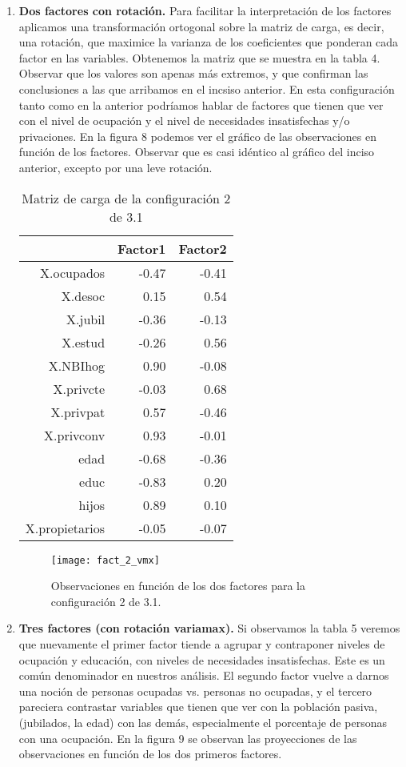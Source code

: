 \documentclass[a4paper,10pt]{article}
\begin{document}
\begin{enumerate}
 \item \textbf{Dos factores con rotación.} Para facilitar la interpretación de los factores aplicamos una transformación ortogonal sobre la matriz de 
 carga, es decir, una rotación, que maximice la varianza de los coeficientes que ponderan cada factor en las variables. Obtenemos la matriz que se 
 muestra en la tabla 4. Observar que los valores son apenas más extremos, y que confirman las conclusiones a las que arribamos en el incsiso anterior.
 En esta configuración tanto como en la anterior podríamos hablar de factores que tienen que ver con el nivel de ocupación y el nivel de necesidades
 insatisfechas y/o privaciones.
 En la figura 8 podemos ver el gráfico de las observaciones en función de los factores. Observar que es casi idéntico al gráfico del inciso anterior, 
 excepto por una leve rotación.
 
  \begin{table}[ht]
  \centering
  \begin{tabular}{rrr}
    \hline
  & Factor1 & Factor2 \\ 
    \hline
  X.ocupados & -0.47 & -0.41 \\ 
    X.desoc & 0.15 & 0.54 \\ 
    X.jubil & -0.36 & -0.13 \\ 
    X.estud & -0.26 & 0.56 \\ 
    X.NBIhog & 0.90 & -0.08 \\ 
    X.privcte & -0.03 & 0.68 \\ 
    X.privpat & 0.57 & -0.46 \\ 
    X.privconv & 0.93 & -0.01 \\ 
    edad & -0.68 & -0.36 \\ 
    educ & -0.83 & 0.20 \\ 
    hijos & 0.89 & 0.10 \\ 
    X.propietarios & -0.05 & -0.07 \\ 
    \hline
  \end{tabular}
  \caption{Matriz de carga de la configuración 2 de 3.1}
  \end{table}
  
  \begin{figure}[h]
  \centering
  \texttt{[image: fact\_2\_vmx]}
  \caption{Observaciones en función de los dos factores para la configuración 2 de 3.1.}
  \end{figure}
 
 \item \textbf{Tres factores (con rotación variamax).} Si observamos la tabla 5 veremos que nuevamente el primer factor tiende a agrupar y contraponer
 niveles de ocupación y educación, con niveles de necesidades insatisfechas. Este es un común denominador en nuestros análisis. El segundo factor vuelve
 a darnos una noción de personas ocupadas vs. personas no ocupadas, y el tercero pareciera contrastar variables que tienen que ver con la población pasiva,
 (jubilados, la edad) con las demás, especialmente el porcentaje de personas con una ocupación. 
 En la figura 9 se observan las proyecciones de las observaciones en función de los dos primeros factores.
 

\end{enumerate}
\end{document}
